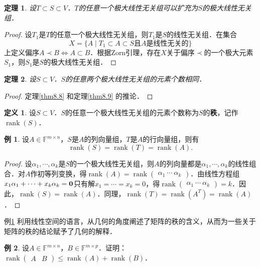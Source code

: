 \documentclass[a4paper,fontset=windows]{ctexbook}
\newtheorem{theorem}{定理}[chapter]
\theoremstyle{definition}
\newtheorem{definition}{定义}[chapter]
\newtheorem{example}{例}[chapter]
\DeclareMathOperator{\rank}{rank}
\renewcommand{\le}{\leqslant}
\begin{document}
\begin{theorem}\label{thm8.10}
设$T\subset S\subset V$．$T$的任意一个极大线性无关组可以扩充为$S$的极大线性无关组．
\end{theorem}

\begin{proof}
设$T_1$是$T$的任意一个极大线性无关组，则$T_1$是$S$的线性无关组．在集合
$$X=\{A\mid\text{$T_1\subset A\subset S$且$A$是线性无关的}\}$$
上定义偏序$A\prec B\Leftrightarrow A\subset B$．根据Zorn引理，存在$X$关于偏序$\prec$的一个极大元素$S_1$，则$S_1$是$S$的极大线性无关组．
\end{proof}

\begin{theorem}
设$S\subset V$．$S$的任意两个极大线性无关组的元素个数相同．
\end{theorem}

\begin{proof}
定理\ref{thm8.8} 和定理\ref{thm8.9} 的推论．
\end{proof}

\begin{definition}
设$S\subset V$．$S$的任意一个极大线性无关组的元素个数称为$S$的{\bf 秩}，记作$\rank(S)$．
\end{definition}

\begin{example}\label{ex8.11}
设$A\in\mathbb{F}^{m\times n}$，$S$是$A$的列向量组，$T$是$A$的行向量组，则有$$\rank(S)=\rank(T)=\rank(A).$$
\end{example}

\begin{proof}
设$\alpha_1,\cdots,\alpha_k$是$S$的一个极大线性无关组，则$A$的列向量都是$\alpha_1,\cdots,\alpha_k$的线性组合．对$A$作初等列变换，得$\rank(A)=\rank\begin{pmatrix}\alpha_1~\cdots~\alpha_k\end{pmatrix}$．由线性方程组$x_1\alpha_1+\cdots+x_k\alpha_k={\bf 0}$只有解$x_1=\cdots=x_k=0$，得$\rank\begin{pmatrix}\alpha_1~\cdots~\alpha_k\end{pmatrix}=k$．因此，$\rank(S)=\rank(A)$．同理，$\rank(T)=\rank(A^T)=\rank(A)$．
\end{proof}

例\ref{ex8.11} 利用线性空间的语言，从几何的角度阐述了矩阵的秩的含义，从而为一些关于矩阵的秩的结论赋予了几何的解释．

\begin{example}
设$A\in\mathbb{F}^{m\times n}$，$B\in\mathbb{F}^{m\times p}$．证明：$\rank\begin{pmatrix}A&B\end{pmatrix}\le\rank(A)+\rank(B)$．
\end{example}
\end{document}
